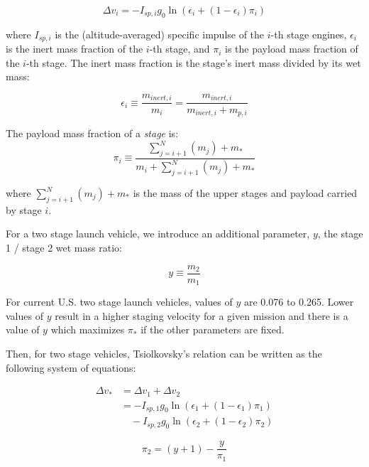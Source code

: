 \documentclass{iaf-iac}
\begin{document}
\begin{multicols}{2}
\begin{equation}
\Delta v_i = - I_{sp,i} g_0 \ln \left( \epsilon_i + (1 - \epsilon_i) \pi_i \right)
\end{equation}

where $I_{sp,i}$ is the (altitude-averaged) specific impulse of the $i$-th stage engines, $\epsilon_i$ is the inert mass fraction of the $i$-th stage, and $\pi_i$ is the payload mass fraction of the $i$-th stage. The inert mass fraction is the stage's inert mass divided by its wet mass:

\begin{equation}
\epsilon_i \equiv \frac{m_{inert,i}}{m_i} = \frac{m_{inert,i}}{m_{inert,i} + m_{p,i}}
\end{equation}

The payload mass fraction of a \emph{stage} is:
\begin{equation}
\pi_i \equiv \frac{\sum_{j=i+1}^N (m_j) + m_*}{m_i + \sum_{j=i+1}^N (m_j) + m_*}
\end{equation}

where $\sum_{j=i+1}^N (m_j) + m_*$ is the mass of the upper stages and payload carried by stage $i$.

For a two stage launch vehicle, we introduce an additional parameter, $y$, the stage 1 / stage 2 wet mass ratio:

\begin{equation}
y \equiv \frac{m_2}{m_1}
\end{equation}

For current U.S. two stage launch vehicles, values of $y$ are 0.076 to 0.265. Lower values of $y$ result in a higher staging velocity for a given mission and there is a value of $y$ which maximizes $\pi_*$ if the other parameters are fixed.

Then, for two stage vehicles, Tsiolkovsky’s relation can be written as the following system of equations:

\begin{equation}
\begin{aligned}
\label{eq:dv_2_stage}
\Delta v_* &= \Delta v_1 + \Delta v_2 \\
           &= - I_{sp,1} g_0 \ln \left( \epsilon_1 + (1 - \epsilon_1) \pi_1 \right) \\
             & \quad - I_{sp,2} g_0 \ln \left( \epsilon_2 + (1 - \epsilon_2) \pi_2 \right)
\end{aligned}
\end{equation}

\begin{equation}
\label{eq:ypi}
\pi_2 = (y + 1) - \frac{y}{\pi_1}
\end{equation}


\end{multicols}
\end{document}
